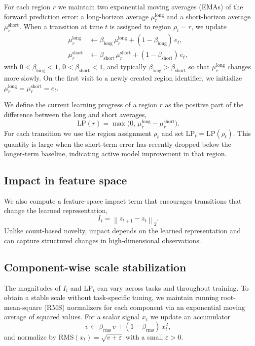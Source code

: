 For each region $r$ we maintain two exponential moving averages (EMAs) of the forward prediction error: a long-horizon average $\mu^{\mathrm{long}}_r$ and a short-horizon average $\mu^{\mathrm{short}}_r$.
When a transition at time $t$ is assigned to region $\rho_t=r$, we update
\begin{align}
    \mu^{\mathrm{long}}_r &\leftarrow \beta_{\mathrm{long}}\,\mu^{\mathrm{long}}_r + (1-\beta_{\mathrm{long}})\,e_t,\\
    \mu^{\mathrm{short}}_r &\leftarrow \beta_{\mathrm{short}}\,\mu^{\mathrm{short}}_r + (1-\beta_{\mathrm{short}})\,e_t,
\end{align}
with $0<\beta_{\mathrm{long}}<1$, $0<\beta_{\mathrm{short}}<1$, and typically $\beta_{\mathrm{long}}>\beta_{\mathrm{short}}$ so that $\mu^{\mathrm{long}}_r$ changes more slowly.
On the first visit to a newly created region identifier, we initialize $\mu^{\mathrm{long}}_r=\mu^{\mathrm{short}}_r=e_t$.

We define the current learning progress of a region $r$ as the positive part of the difference between the long and short averages,
\begin{equation}
    \mathrm{LP}(r) = \max\big(0,\,\mu^{\mathrm{long}}_{r}-\mu^{\mathrm{short}}_{r}\big).
\end{equation}
For each transition we use the region assignment $\rho_t$ and set $\mathrm{LP}_t=\mathrm{LP}(\rho_t)$.
This quantity is large when the short-term error has recently dropped below the longer-term baseline, indicating active model improvement in that region.

\subsection{Impact in feature space}

We also compute a feature-space impact term that encourages transitions that change the learned representation,
\begin{equation}
    I_t = \left\lVert z_{t+1}-z_t \right\rVert_2.
\end{equation}
Unlike count-based novelty, impact depends on the learned representation and can capture structured changes in high-dimensional observations.

\subsection{Component-wise scale stabilization}

The magnitudes of $I_t$ and $\mathrm{LP}_t$ can vary across tasks and throughout training.
To obtain a stable scale without task-specific tuning, we maintain running root-mean-square (RMS) normalizers for each component via an exponential moving average of squared values.
For a scalar signal $x_t$ we update an accumulator
\begin{equation}
    v \leftarrow \beta_{\mathrm{rms}}\,v + (1-\beta_{\mathrm{rms}})\,x_t^2,
\end{equation}
and normalize by $\mathrm{RMS}(x_t)=\sqrt{v+\varepsilon}$ with a small $\varepsilon>0$.

